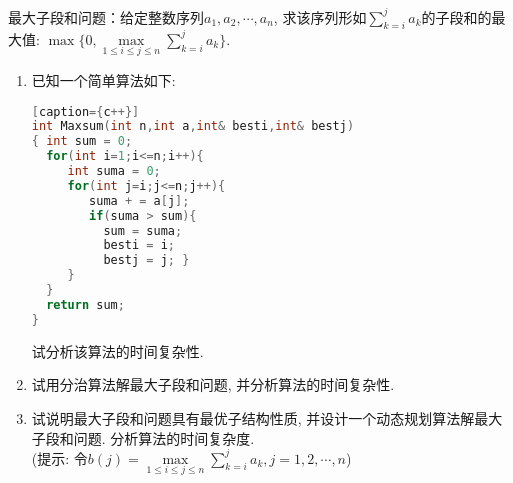 \begin{problem}[习题5.1]
最大子段和问题：给定整数序列$a_1, a_2, \cdots, a_n$, 求该序列形如$\sum_{k=i}^j a_k$的子段和的最大值:
$\max\{0, \max\limits_{1\leq i\leq j\leq n}\sum_{k=i}^j a_k\}$.
\begin{enumerate}
\item 已知一个简单算法如下:
\begin{lstlisting}[language=C++][caption={c++}]
int Maxsum(int n,int a,int& besti,int& bestj)
{ int sum = 0;
  for(int i=1;i<=n;i++){
     int suma = 0;
     for(int j=i;j<=n;j++){
        suma + = a[j];
        if(suma > sum){
          sum = suma;
          besti = i;
          bestj = j; }
     }
  }
  return sum;
}
\end{lstlisting}
试分析该算法的时间复杂性.
\item 试用分治算法解最大子段和问题, 并分析算法的时间复杂性.
\item 试说明最大子段和问题具有最优子结构性质, 并设计一个动态规划算法解最大子段和问题. 分析算法的时间复杂度.\\
(提示: 令$b(j) = \max\limits_{1\leq i\leq j\leq n}\sum_{k=i}^j a_k, j = 1, 2, \cdots, n$)
\end{enumerate}
\end{problem}
